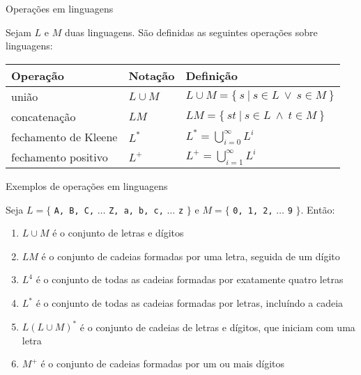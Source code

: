 \begin{frame}[fragile]{Operações em linguagens}

    Sejam $L$ e $M$ duas linguagens. São definidas as seguintes operações sobre linguagens:
    \vspace{0.2in}

    \begin{tabularx}{0.95\textwidth}{llX}
        \toprule
        \textbf{Operação} & \textbf{Notação} & \textbf{Definição} \\
        \midrule
        união & $L\cup M$ & $L\cup M = \{\ s\ |\ s\in L\ \vee\ s\in M\ \}$ \\
        \rowcolor[gray]{0.9}
        concatenação & $LM$ & $LM = \{\ st\ |\ s\in L\ \land\ t\in M\ \}$ \\
        fechamento de Kleene & $\displaystyle L^*$ & $\displaystyle L^* = \bigcup_{i = 0}^\infty L^i$ \\
        \rowcolor[gray]{0.9}
        fechamento positivo & $L^+$ & $\displaystyle L^+ = \bigcup_{i = 1}^\infty L^i$ \\
        \bottomrule
    \end{tabularx}

\end{frame}

\begin{frame}[fragile]{Exemplos de operações em linguagens}

    Seja $L = \{$ \texttt{A, B, C,} $\ldots$ \texttt{Z, a, b, c,} $\ldots$ \texttt{z} $\}$ e $M = \{$ \texttt{0, 1, 2,} $\ldots$ \texttt{9} $\}$. Então:
    \vspace{0.2in}

    \begin{enumerate}
        \item $L\cup M$ é o conjunto de letras e dígitos

        \item $LM$ é o conjunto de cadeias formadas por uma letra, seguida de um dígito

        \item $L^4$ é o conjunto de todas as cadeias formadas por exatamente quatro letras

        \item $L^*$ é o conjunto de todas as cadeias formadas por letras, incluíndo a cadeia 

        \item $L(L\cup M)^*$ é o conjunto de cadeias de letras e dígitos, que iniciam com uma letra

        \item $M^+$ é o conjunto de cadeias formadas por um ou mais dígitos
    \end{enumerate}

\end{frame}

